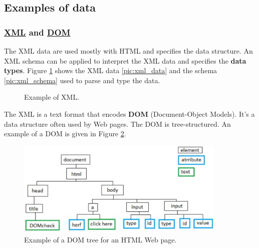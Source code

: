 \subsection{Examples of data}

\subsubsection{\href{https://en.wikipedia.org/wiki/XML}{XML} and \href{https://en.wikipedia.org/wiki/Document\_Object\_Model}{DOM}}

The XML data are used mostly with HTML and specifies the data structure. An XML schema can be applied to interpret the XML data and specifies the {\bf data types}. Figure \ref{pic:xml} shows the XML data \ref{pic:xml_data} and the schema \ref{pic:xml_schema} used to parse and type the data.

\begin{figure} [h] %
\centerline{
}
\caption{\label{pic:xml} Example of XML.} 
\end{figure}

The XML is a text format that encodes {\bf DOM} (Document-Object Models). It's a data structure often used by Web pages. The DOM is tree-structured. An example of a DOM is given in Figure \ref{pic:dom}.

\begin{figure}[H]%
 \centering
 \includegraphics[width=10cm]{./img/04/dom}
 \caption{\label{pic:dom} Example of a DOM tree for an HTML Web page.}
\end{figure}

